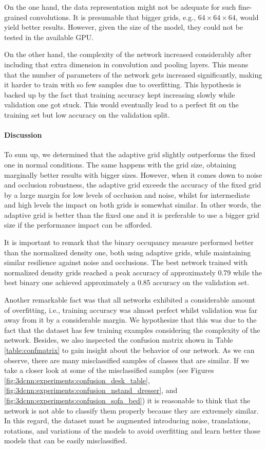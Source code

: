 On the one hand, the data representation might not be adequate for such fine-grained convolutions. It is presumable that bigger grids, e.g., $64\times64\times64$, would yield better results. However, given the size of the model, they could not be tested in the available GPU.

On the other hand, the complexity of the network increased considerably after including that extra dimension in convolution and pooling layers. This means that the number of parameters of the network gets increased significantly, making it harder to train with so few samples due to overfitting. This hypothesis is backed up by the fact that training accuracy kept increasing slowly while validation one got stuck. This would eventually lead to a perfect fit on the training set but low accuracy on the validation split.

\paragraph{Discussion}

To sum up, we determined that the adaptive grid slightly outperforms the fixed one in normal conditions. The same happens with the grid size, obtaining marginally better results with bigger sizes. However, when it comes down to noise and occlusion robustness, the adaptive grid exceeds the accuracy of the fixed grid by a large margin for low levels of occlusion and noise, whilst for intermediate and high levels the impact on both grids is somewhat similar. In other words, the adaptive grid is better than the fixed one and it is preferable to use a bigger grid size if the performance impact can be afforded.

It is important to remark that the binary occupancy measure performed better than the normalized density one, both using adaptive grids, while maintaining similar resilience against noise and occlusions. The best network trained with normalized density grids reached a peak accuracy of approximately 0.79 while the best binary one achieved approximately a 0.85 accuracy on the validation set.

Another remarkable fact was that all networks exhibited a considerable amount of overfitting, i.e., training accuracy was almost perfect whilst validation was far away from it by a considerable margin. We hypothesize that this was due to the fact that the dataset has few training examples considering the complexity of the network. Besides, we also inspected the confusion matrix shown in Table \ref{table:confmatrix} to gain insight about the behavior of our network. As we can observe, there are many misclassified samples of classes that are similar. If we take a closer look at some of the misclassified samples (see Figures \ref{fig:3dcnn:experiments:confusion_desk_table}, \ref{fig:3dcnn:experiments:confusion_nstand_dresser}, and \ref{fig:3dcnn:experiments:confusion_sofa_bed}) it is reasonable to think that the network is not able to classify them properly because they are extremely similar. In this regard, the dataset must be augmented introducing noise, translations, rotations, and variations of the models to avoid overfitting and learn better those models that can be easily misclassified.

